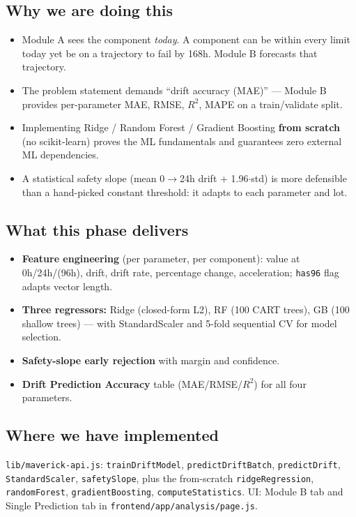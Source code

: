 \documentclass[11pt,a4paper]{article}
\newcommand{\code}[1]{\texttt{\small #1}}
\begin{document}
\subsection*{Why we are doing this}
\begin{itemize}[leftmargin=1.5em]
  \item Module A sees the component \emph{today}. A component can be within every limit today yet
        be on a trajectory to fail by 168h. Module B forecasts that trajectory.
  \item The problem statement demands ``drift accuracy (MAE)'' --- Module B provides per-parameter
        MAE, RMSE, $R^2$, MAPE on a train/validate split.
  \item Implementing Ridge / Random Forest / Gradient Boosting \textbf{from scratch} (no scikit-learn)
        proves the ML fundamentals and guarantees zero external ML dependencies.
  \item A statistical safety slope (mean 0$\rightarrow$24h drift + 1.96$\cdot$std) is more
        defensible than a hand-picked constant threshold: it adapts to each parameter and lot.
\end{itemize}

\subsection*{What this phase delivers}
\begin{itemize}[leftmargin=1.5em]
  \item \textbf{Feature engineering} (per parameter, per component): value at 0h/24h/(96h), drift,
        drift rate, percentage change, acceleration; \code{has96} flag adapts vector length.
  \item \textbf{Three regressors:} Ridge (closed-form L2), RF (100 CART trees), GB (100 shallow
        trees) --- with StandardScaler and 5-fold sequential CV for model selection.
  \item \textbf{Safety-slope early rejection} with margin and confidence.
  \item \textbf{Drift Prediction Accuracy} table (MAE/RMSE/$R^2$) for all four parameters.
\end{itemize}

\subsection*{Where we have implemented}
\code{lib/maverick-api.js}: \code{trainDriftModel}, \code{predictDriftBatch},
\code{predictDrift}, \code{StandardScaler}, \code{safetySlope}, plus the from-scratch
\code{ridgeRegression}, \code{randomForest}, \code{gradientBoosting}, \code{computeStatistics}.
UI: Module B tab and Single Prediction tab in \code{frontend/app/analysis/page.js}.
\end{document}
